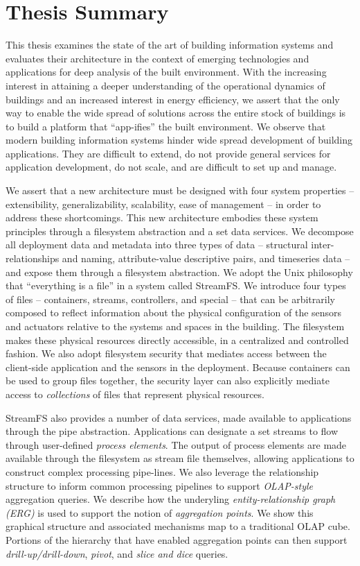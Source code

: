 \section{Thesis Summary}
\label{chap:done}

This thesis examines the state of the art of building information systems and evaluates their architecture in the context
of emerging technologies and applications for deep analysis of the built environment.  With the increasing interest in
attaining a deeper understanding of the operational dynamics of buildings and an increased interest in energy efficiency,
we assert that the only way to enable the wide spread of solutions across the entire stock of buildings is to build a platform
that ``app-ifies'' the built environment.  We observe that modern building information systems hinder wide spread development 
of building applications.  They are difficult to extend, do not provide general services for application development, do not
scale, and are difficult to set up and manage.  

We assert that a new architecture must be designed with four system properties -- extensibility, generalizability, scalability,
ease of management -- in order to address these shortcomings.  
This new architecture embodies these system principles through a filesystem abstraction and a set data services.  We decompose
all deployment data and metadata into three types of data -- structural inter-relationships and naming, attribute-value descriptive pairs,
and timeseries data -- and expose them through a filesystem abstraction.  We adopt the Unix philosophy that ``everything is a file'' in a
system called StreamFS.  We introduce four types of files -- containers, streams, controllers, and special -- that can be arbitrarily
composed to reflect information about the physical configuration of the sensors and actuators relative to the systems and spaces in
the building.  The filesystem makes these physical resources directly accessible, in a centralized and controlled fashion.  We
also adopt filesystem security that mediates access between the client-side application and the sensors in the deployment.
Because containers can be used to group files together, the security layer can also explicitly mediate access to \emph{collections}
of files that represent physical resources.

StreamFS also provides a number of data services, made available to applications through the pipe abstraction.  Applications can 
designate a set streams to flow through user-defined \emph{process elements}.  The output of process elements are made available
through the filesystem as stream file themselves, allowing applications to construct complex processing pipe-lines.
We also leverage the relationship structure to inform common processing pipelines to support \emph{OLAP-style} aggregation
queries.  We describe how the underyling \emph{entity-relationship graph (ERG)} is used to support the notion of \emph{aggregation points}.
We show this graphical structure and associated mechanisms map to a traditional OLAP cube.  Portions of the hierarchy that have 
enabled aggregation points can then support \emph{drill-up/drill-down}, \emph{pivot}, and \emph{slice and dice} queries.

